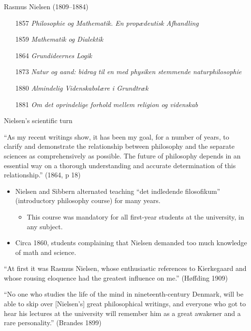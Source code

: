 \documentclass[ignorenonframetext, ]{beamer}
\begin{document}
\begin{frame}{Rasmus Nielsen (1809--1884)}

  \begin{itemize}
  \item[1857] \emph{Philosophie og Mathematik. En propædeutisk
      Afhandling}
  \item[1859] \textit{Mathematik og Dialektik}
  \item[1864] \textit{Grundideernes Logik}
  \item[1873] \textit{Natur og aand: bidrag til en med physiken
      stemmende naturphilosophie}
  \item[1880] \emph{Almindelig Videnskabslære i Grundtræk}
  \item[1881] \emph{Om det oprindelige forhold mellem religion og
      videnskab}
  \end{itemize}
    
\end{frame}

\begin{frame}{Nielsen's scientific turn}

  ``As my recent writings show, it has been my goal, for a number of
years, to clarify and demonstrate the relationship between philosophy
and the separate sciences as comprehensively as possible. The future
of philosophy depends in an essential way on a thorough understanding
and accurate determination of this relationship.'' (1864, p 18)
  
\end{frame}

\begin{frame}

\begin{itemize}
\item Nielsen and Sibbern alternated teaching ``det indledende
  filosofikum'' (introductory philosophy course) for many years.
  \begin{itemize}
  \item This course was mandatory for all first-year students at the
    university, in any subject.
  \end{itemize}
\item Circa 1860, students complaining that Nielsen demanded too much
  knowledge of math and science.
\end{itemize}
\end{frame}

\begin{frame}

``At first it was Rasmus Nielsen, whose enthusiastic references to
  Kierkegaard and whose rousing eloquence had the greatest influence
  on me.'' (Høffding 1909)

  \vfill

  ``No one who studies the life of the mind in nineteenth-century
  Denmark, will be able to skip over [Nielsen's] great philosophical
  writings, and everyone who got to hear his lectures at the
  university will remember him as a great awakener and a rare
  personality.'' (Brandes 1899)
  
\end{frame}
\end{document}
